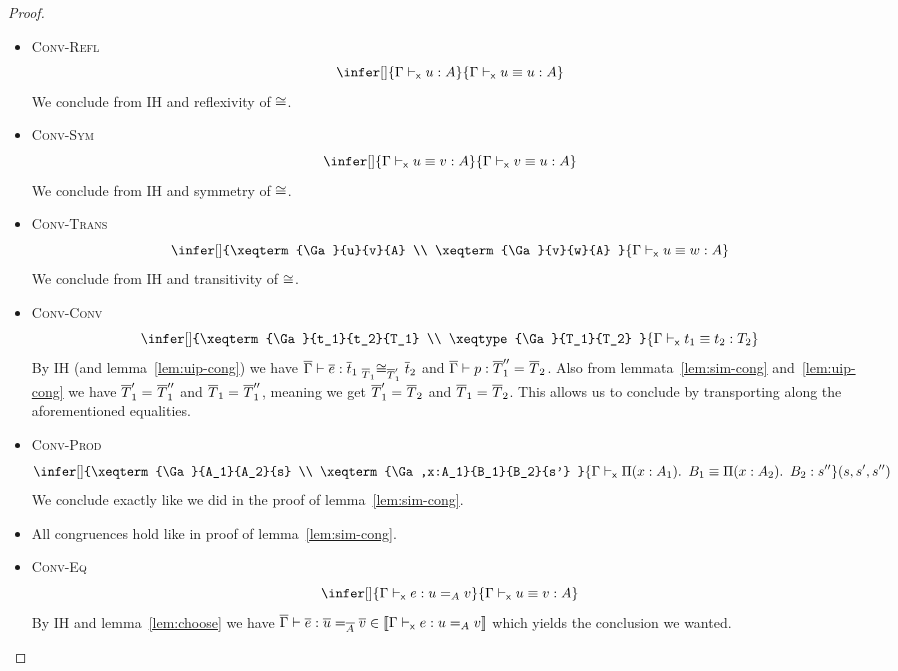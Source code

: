 \begin{proof}
\begin{itemize}
    \item \textsc{Conv-Refl}
    \[
      \infer[]
        {\xisterm{\Ga}{u}{A}}
        {\xeqterm{\Ga}{u}{u}{A}}
    \]
    We conclude from IH and reflexivity of $\cong$.

    \item \textsc{Conv-Sym}
    \[
      \infer[]
        {\xeqterm{\Ga}{u}{v}{A}}
        {\xeqterm{\Ga}{v}{u}{A}}
    \]
    We conclude from IH and symmetry of $\cong$.

    \item \textsc{Conv-Trans}
    \[
      \infer[]
        {\xeqterm{\Ga}{u}{v}{A} \\
         \xeqterm{\Ga}{v}{w}{A}
        }
        {\xeqterm{\Ga}{u}{w}{A}}
    \]
    We conclude from IH and transitivity of $\cong$.


    \item \textsc{Conv-Conv}
    \[
      \infer[]
        {\xeqterm{\Ga}{t_1}{t_2}{T_1} \\
         \xeqtype{\Ga}{T_1}{T_2}
        }
        {\xeqterm{\Ga}{t_1}{t_2}{T_2}}
    \]
    By IH (and lemma~\ref{lem:uip-cong}) we have
    $\overline{\Gamma} \vdash \overline{e} : \overline{t}_1 \mathrel{{}_{\overline{T}_1}{\cong}_{\overline{T}'_1}} \overline{t}_2$ and
    $\overline{\Gamma} \vdash p : \overline{T}''_1 =_{} \overline{T}_2$. Also from
    lemmata~\ref{lem:sim-cong} and~\ref{lem:uip-cong} we have
    $\overline{T}'_1 =_{} \overline{T}''_1$ and $\overline{T}_1 =_{} \overline{T}''_1$, meaning we get
    $\overline{T}'_1 =_{} \overline{T}_2$ and $\overline{T}_1 =_{} \overline{T}_2$.
    This allows us to conclude by transporting along the aforementioned
    equalities.

    \item \textsc{Conv-Prod}
    \[
      \infer[]
        {\xeqterm{\Ga}{A_1}{A_2}{s} \\
         \xeqterm{\Ga,x:A_1}{B_1}{B_2}{s'}
        }
        {\xeqterm{\Ga}{\Prod{x:A_1} B_1}{\Prod{x:A_2} B_2}{s''}}
      (s,s',s'')
    \]
    We conclude exactly like we did in the proof of lemma~\ref{lem:sim-cong}.

    \item All congruences hold like in proof of
    lemma~\ref{lem:sim-cong}.

    \item \textsc{Conv-Eq}
    \[
      \infer[]
        {\xisterm{\Ga}{e}{\Eq{A}{u}{v}}}
        {\xeqterm{\Ga}{u}{v}{A}}
    \]
    By IH and lemma~\ref{lem:choose} we have
    $\overline{\Gamma} \vdash \overline{e} : \overline{u} =_{\overline{A}} \overline{v}
    \in \llbracket \Gamma \vdash_{\mathsf{x}} e : u =_{A} v \rrbracket$ which yields the conclusion we
    wanted.
  \end{itemize}
\end{proof}